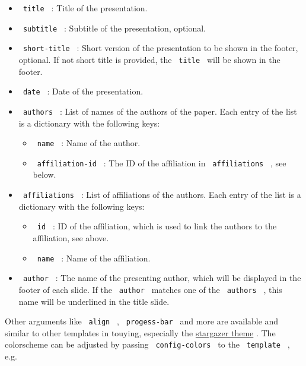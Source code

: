 \begin{itemize}
\tightlist
\item
  \texttt{\ title\ } : Title of the presentation.
\item
  \texttt{\ subtitle\ } : Subtitle of the presentation, optional.
\item
  \texttt{\ short-title\ } : Short version of the presentation to be
  shown in the footer, optional. If not short title is provided, the
  \texttt{\ title\ } will be shown in the footer.
\item
  \texttt{\ date\ } : Date of the presentation.
\item
  \texttt{\ authors\ } : List of names of the authors of the paper. Each
  entry of the list is a dictionary with the following keys:

  \begin{itemize}
  \tightlist
  \item
    \texttt{\ name\ } : Name of the author.
  \item
    \texttt{\ affiliation-id\ } : The ID of the affiliation in
    \texttt{\ affiliations\ } , see below.
  \end{itemize}
\item
  \texttt{\ affiliations\ } : List of affiliations of the authors. Each
  entry of the list is a dictionary with the following keys:

  \begin{itemize}
  \tightlist
  \item
    \texttt{\ id\ } : ID of the affiliation, which is used to link the
    authors to the affiliation, see above.
  \item
    \texttt{\ name\ } : Name of the affiliation.
  \end{itemize}
\item
  \texttt{\ author\ } : The name of the presenting author, which will be
  displayed in the footer of each slide. If the \texttt{\ author\ }
  matches one of the \texttt{\ authors\ } , this name will be underlined
  in the title slide.
\end{itemize}

Other arguments like \texttt{\ align\ } , \texttt{\ progess-bar\ } and
more are available and similar to other templates in touying, especially
the \href{https://touying-typ.github.io/docs/themes/stargazer}{stargazer
theme} . The colorscheme can be adjusted by passing
\texttt{\ config-colors\ } to the \texttt{\ template\ } , e.g.

\begin{Shaded}
\begin{Highlighting}[]
\NormalTok{)}
\end{Highlighting}
\end{Shaded}

